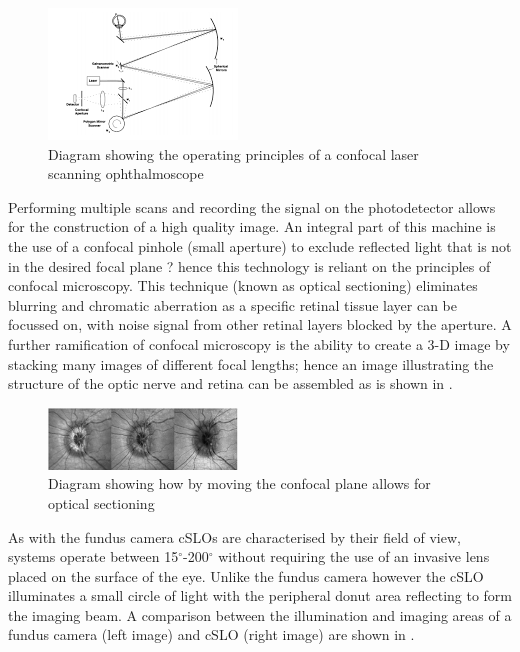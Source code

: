 \begin{figure}[H]
\centering
\includegraphics{figures/cslo}
\caption{Diagram showing the operating principles of a confocal laser scanning ophthalmoscope}
\label{fig:cslo}
\end{figure}

Performing multiple scans and recording the signal on the photodetector
allows for the construction of a high quality image. An integral part of
this machine is the use of a confocal pinhole (small aperture) to exclude
reflected light that is not in the desired focal plane ? hence this technology
is reliant on the principles of confocal microscopy. This technique (known as
optical sectioning) eliminates blurring and chromatic aberration as a specific
retinal tissue layer can be focussed on, with noise signal from other retinal
layers blocked by the aperture.\cite{sharp2004scanning} A further
ramification of confocal microscopy is the ability to create a 3-D image by
stacking many images of different focal lengths; hence an image illustrating
the structure of the optic nerve and retina can be assembled as is shown in .

\begin{figure}[H]
\centering
\includegraphics{figures/confocalimages}
\caption{Diagram showing how by moving the confocal plane allows for optical sectioning}
\label{fig:3dconfocal}
\end{figure}

As with the fundus camera cSLOs are characterised by their field of view,
systems operate between 15$^\circ$-200$^\circ$ without requiring the use
of an invasive lens placed on the surface of the eye. Unlike the fundus
camera however the cSLO illuminates a small circle of light with the peripheral 
donut area reflecting to form the imaging beam. A comparison between the illumination and imaging areas of a fundus camera (left image) and cSLO (right image) are shown in  .

